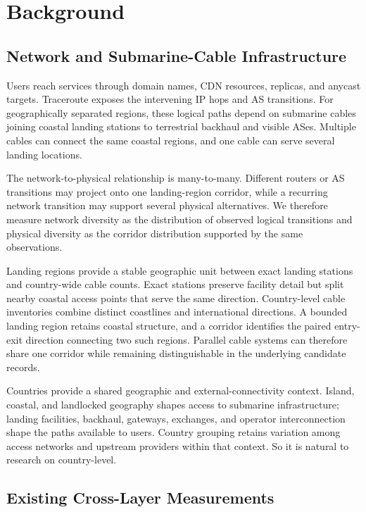 \section{Background}
\label{sec:background}

\subsection{Network and Submarine-Cable Infrastructure}
\label{sec:background_cross_layer}

Users reach services through domain names, CDN resources, replicas, and anycast
targets. Traceroute exposes the intervening IP hops and AS transitions. For
geographically separated regions, these logical paths depend on submarine
cables joining coastal landing stations to terrestrial backhaul and visible
ASes. Multiple cables can connect the same coastal regions, and one cable can
serve several landing locations.

The network-to-physical relationship is many-to-many. Different routers or AS
transitions may project onto one landing-region corridor, while a recurring
network transition may support several physical alternatives. We therefore
measure network diversity as the distribution of observed logical transitions
and physical diversity as the corridor distribution supported by the same
observations.

Landing regions provide a stable geographic unit between exact landing stations
and country-wide cable counts. Exact stations preserve facility detail but split
nearby coastal access points that serve the same direction. Country-level cable
inventories combine distinct coastlines and international directions. A bounded
landing region retains coastal structure, and a corridor identifies the paired
entry-exit direction connecting two such regions. Parallel cable systems can
therefore share one corridor while remaining distinguishable in the underlying
candidate records.

Countries provide a shared geographic and external-connectivity context.
Island, coastal, and landlocked geography shapes access to submarine
infrastructure; landing facilities, backhaul, gateways, exchanges, and operator
interconnection shape the paths available to users. Country grouping retains
variation among access networks and upstream providers within that context. So it is natural to research on country-level.

\subsection{Existing Cross-Layer Measurements}
\label{sec:background_existing_work}

